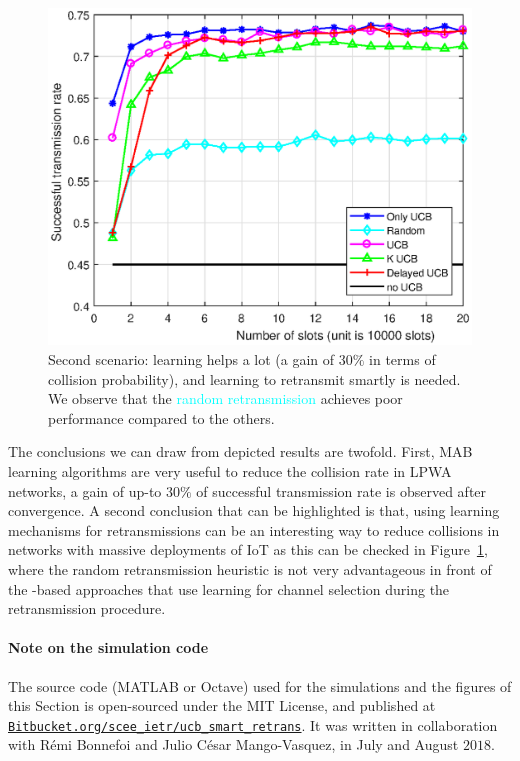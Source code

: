 \begin{figure}[h!]  %
	\centering
	\includegraphics[width=0.75\linewidth]{ResultsUCB2.eps}
	\caption[First comparison between the exposed heuristics for the retransmission: Only \UCB, Random, \UCB, $K$ \UCB, and Delayed \UCB]{
		Second scenario: learning helps a lot (a gain of $30\%$ in terms of collision probability), and learning to retransmit smartly is needed.
		We observe that the \textcolor{cyan}{random retransmission} achieves poor performance compared to the others.
	}
	\label{fig:43:mainExperiment2}
\end{figure}

The conclusions we can draw from depicted results are twofold.
First, MAB learning algorithms are very useful to reduce the collision rate in LPWA networks, a gain of up-to $30\%$ of successful transmission rate is observed after convergence.
A second conclusion that can be highlighted is that, using learning mechanisms for retransmissions can be an interesting way to reduce collisions in networks with massive deployments of IoT as this can be checked in Figure~\ref{fig:43:mainExperiment2}, where the random retransmission heuristic is not very advantageous in front of the  \UCB-based approaches that use learning for channel selection during the retransmission procedure.


\paragraph{Note on the simulation code}
%
The source code (MATLAB or Octave) used for the simulations and the figures of this Section is open-sourced under the MIT License, and published at \href{https://Bitbucket.org/scee_ietr/ucb_smart_retrans}{\texttt{Bitbucket.org/scee\_ietr/ucb\_smart\_retrans}}.
It was written in collaboration with Rémi Bonnefoi and Julio César Mango-Vasquez, in July and August $2018$.
